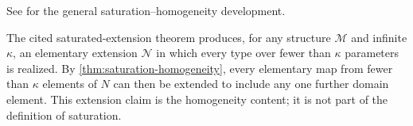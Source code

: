 See \cite{Marker2002} for the general saturation--homogeneity development.

\begin{example}
The cited saturated-extension theorem produces, for any structure
\(\mathcal M\) and infinite \(\kappa\), an elementary extension
\(\mathcal N\) in which every type over fewer than \(\kappa\) parameters is
realized.  By \cref{thm:saturation-homogeneity}, every elementary map from
fewer than \(\kappa\) elements of \(N\) can then be extended to include any
one further domain element.  This extension claim is the homogeneity content;
it is not part of the definition of saturation.
\end{example}

